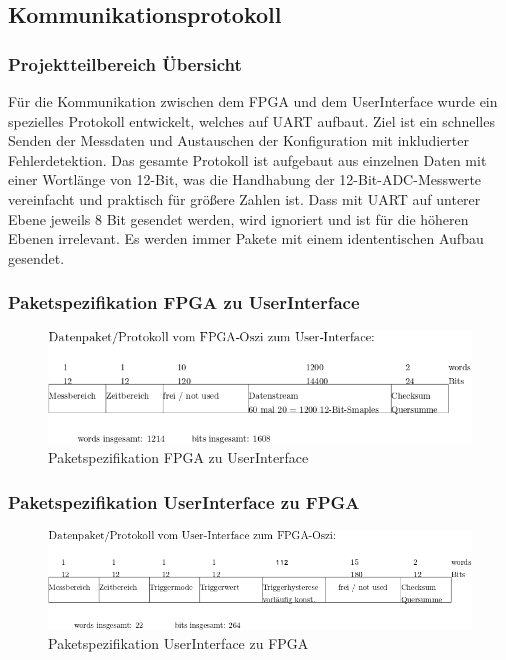 \subsection{Kommunikationsprotokoll}\label{Protokoll}
\subsubsection{Projektteilbereich Übersicht}
Für die Kommunikation zwischen dem FPGA und dem UserInterface wurde ein spezielles Protokoll entwickelt, welches auf UART aufbaut. Ziel ist ein schnelles Senden der Messdaten und Austauschen der Konfiguration mit inkludierter Fehlerdetektion. Das gesamte Protokoll ist aufgebaut aus einzelnen Daten mit einer Wortlänge von 12-Bit, was die Handhabung der 12-Bit-ADC-Messwerte vereinfacht und praktisch für größere Zahlen ist. Dass mit UART  auf unterer Ebene jeweils 8 Bit gesendet werden, wird ignoriert und ist für die höheren Ebenen irrelevant. Es werden immer Pakete mit einem idententischen Aufbau gesendet.
\subsubsection{Paketspezifikation FPGA zu UserInterface}
\begin{figure}[!h]
\begin{center}
\includegraphics[width=15cm]{SAUER/Grafiken/Kommunikationsprotokoll/Datenstreampaket.png}
\caption{Paketspezifikation FPGA zu UserInterface}
\label{Datenstreampaket}
\end{center}
\end{figure}
\subsubsection{Paketspezifikation UserInterface zu FPGA}
\begin{figure}[h]
\begin{center}
\includegraphics[width=15cm]{SAUER/Grafiken/Kommunikationsprotokoll/Controllerpaket.png}
\caption{Paketspezifikation UserInterface zu FPGA}
\label{Controllerpaket}
\end{center}
\end{figure}

